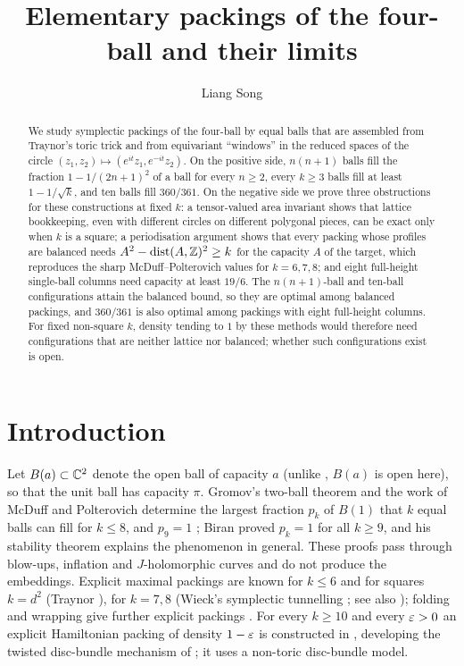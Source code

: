 \documentclass[11pt]{amsart}
\title{Elementary packings of the four-ball and their limits}
\author{Liang Song}
\date{}
\begin{document}
\begin{abstract}
We study symplectic packings of the four-ball by equal balls that are assembled from Traynor's toric trick and
from equivariant ``windows'' in the reduced spaces of the circle $(z_1,z_2)\mapsto(e^{it}z_1,e^{-it}z_2)$. On the
positive side, $n(n+1)$ balls fill the fraction $1-1/(2n+1)^2$ of a ball for every $n\ge2$, every $k\ge3$ balls fill
at least $1-1/\sqrt k$, and ten balls fill $360/361$. On the negative side we prove three obstructions for these
constructions at fixed $k$: a tensor-valued area invariant shows that lattice bookkeeping, even with different
circles on different polygonal pieces, can be exact only when $k$ is a square; a periodisation argument shows
that every packing whose profiles are balanced needs $A^2-\operatorname{dist}(A,\mathbb{Z})^2\ge k$ for the capacity $A$ of the
target, which reproduces the sharp McDuff--Polterovich values for $k=6,7,8$; and eight full-height single-ball
columns need capacity at least $19/6$. The $n(n+1)$-ball and ten-ball configurations attain the balanced bound, so they are optimal among balanced
packings, and $360/361$ is also optimal among packings with eight full-height columns. For fixed non-square $k$,
density tending to $1$ by these methods would therefore need configurations that are neither lattice nor balanced; whether such configurations exist is open.
\end{abstract}
\maketitle

\section{Introduction}\label{sec:intro}

Let $B(a)\subset\mathbb{C}^2$ denote the open ball of capacity $a$ (unlike \cite{SongP1}, $B(a)$ is open here), so that the unit ball has capacity $\pi$. Gromov's
two-ball theorem \cite{Gromov1985} and the work of McDuff and Polterovich \cite{McDuffPolterovich1994} determine
the largest fraction $p_k$ of $B(1)$ that $k$ equal balls can fill for $k\le8$, and $p_9=1$ \cite{McDuffPolterovich1994};
Biran \cite{Biran1997} proved $p_k=1$ for all $k\ge9$, and his stability theorem \cite{Biran1999} explains the phenomenon in general. These proofs
pass through blow-ups, inflation and $J$-holomorphic curves and do not produce the embeddings. Explicit maximal
packings are known for $k\le6$ and for squares $k=d^2$ (Traynor \cite{Traynor1995}), for $k=7,8$ (Wieck's
symplectic tunnelling \cite{Wieck2009}; see also \cite{Opshtein2011}); folding and wrapping give further explicit packings
\cite{SchlenkHand,SchlenkBook,Schlenk2018}. For every $k\ge10$ and every $\varepsilon>0$ an explicit Hamiltonian packing of
density $1-\varepsilon$ is constructed in \cite{SongP1}, developing the twisted disc-bundle mechanism of
\cite{OpenAI2026}; it uses a non-toric disc-bundle model.
\end{document}
